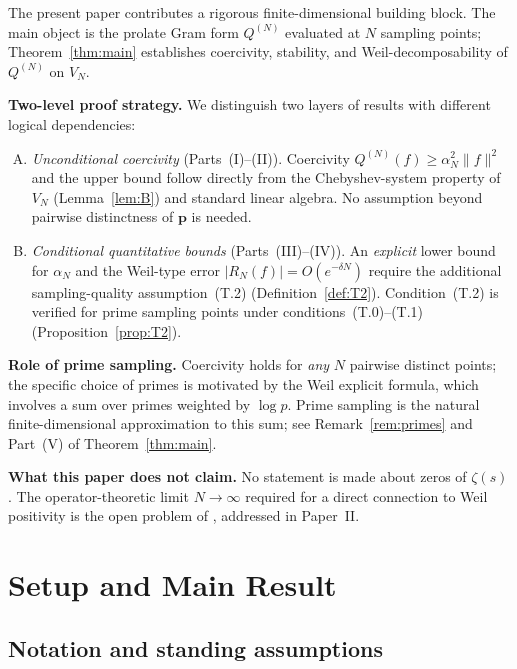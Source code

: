 \documentclass[12pt,a4paper]{amsart}
\theoremstyle{definition}
\newcommand{\AM}{\alpha_N}
\newcommand{\QM}{Q^{(N)}}
\newcommand{\norm}[1]{\|#1\|}
\begin{document}
The present paper contributes a rigorous finite-dimensional building
block. The main object is the prolate Gram form $\QM$ evaluated at $N$
sampling points; Theorem~\ref{thm:main} establishes coercivity,
stability, and Weil-decomposability of $\QM$ on $V_N$.

\medskip
\noindent\textbf{Two-level proof strategy.}
We distinguish two layers of results with different logical
dependencies:
\begin{enumerate}[(A)]
\item \emph{Unconditional coercivity} (Parts~(I)--(II)).
Coercivity $\QM(f)\geq\AM^2\norm{f}^2$ and the upper bound follow
directly from the Chebyshev-system property of $V_N$
(Lemma~\ref{lem:B}) and standard linear algebra.
No assumption beyond pairwise distinctness of $\mathbf{p}$ is needed.
\item \emph{Conditional quantitative bounds} (Parts~(III)--(IV)).
An \emph{explicit} lower bound for $\AM$ and the Weil-type error
$|R_N(f)|=O(e^{-\delta N})$ require the additional sampling-quality
assumption~\textup{(T.2)} (Definition~\ref{def:T2}).
Condition~(T.2) is verified for prime sampling points under
conditions~(T.0)--(T.1) (Proposition~\ref{prop:T2}).
\end{enumerate}

\medskip
\noindent\textbf{Role of prime sampling.}
Coercivity holds for \emph{any} $N$ pairwise distinct points;
the specific choice of primes is motivated by the Weil explicit
formula, which involves a sum over primes weighted by $\log p$.
Prime sampling is the natural finite-dimensional approximation
to this sum; see Remark~\ref{rem:primes} and Part~(V) of
Theorem~\ref{thm:main}.

\medskip
\noindent\textbf{What this paper does not claim.}
No statement is made about zeros of $\zeta(s)$.
The operator-theoretic limit $N\to\infty$ required for a
direct connection to Weil positivity is the open problem
of \cite{CCM2025}, addressed in Paper~II.

\section{Setup and Main Result}\label{sec:setup}

\subsection{Notation and standing assumptions}
\end{document}
